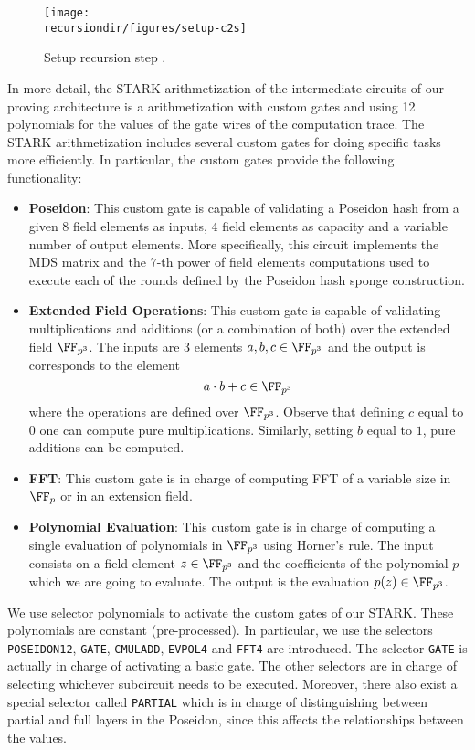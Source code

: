 \begin{figure}[H]
\centering
\texttt{[image: \\recursiondir/figures/setup-c2s]}
\caption{Setup recursion step \ctos.}
\label{fig:setup-c2s}
\end{figure}

In more detail, the STARK arithmetization of the intermediate circuits of our proving architecture is a  arithmetization with custom gates and using 12 polynomials for the values of the gate wires of the computation trace.
The STARK arithmetization includes several custom gates for doing specific tasks more efficiently. In particular, the custom gates provide the following functionality:

\begin{itemize}
\item \textbf{Poseidon}: This custom gate is capable of validating a Poseidon hash from a given $8$ field elements as inputs, $4$ field elements as capacity and a variable number of output elements. More specifically, this circuit implements the MDS matrix and the $7$-th power of field elements computations used to execute each of the rounds defined by the Poseidon hash sponge construction. 
\item \textbf{Extended Field Operations}: This custom gate is capable of validating multiplications and additions (or a combination of both) over the extended field $\FF_{p^3}$. The inputs are $3$ elements $a, b, c \in \FF_{p^3}$ and the output is corresponds to the element 
\[
a \cdot b + c \in \FF_{p^3}
\]
where the operations are defined over $\FF_{p^3}$. Observe that defining $c$ equal to $0$ one can compute pure multiplications. Similarly, setting $b$ equal to $1$, pure additions can be computed. 

\item \textbf{FFT}: This custom gate is in charge of computing FFT of a variable size in $\FF_p$ or in an extension field. 

\item \textbf{Polynomial Evaluation}: This custom gate is in charge of computing a single evaluation of polynomials in $\FF_{p^3}$ using Horner's rule. The input consists on a field element $z \in \FF_{p^3}$ and the coefficients of the polynomial $p$ which we are going to evaluate. The output is the evaluation $p(z) \in \FF_{p^3}$. 
\end{itemize}

We use selector polynomials to activate the custom gates of our STARK. 
These polynomials are constant (pre-processed). In particular, we use the selectors \texttt{POSEIDON12}, \texttt{GATE}, \texttt{CMULADD}, \texttt{EVPOL4} and \texttt{FFT4} are introduced. The selector \texttt{GATE} is actually in charge of activating a basic \plonk gate. The other selectors are in charge of selecting whichever subcircuit needs to be executed. Moreover, there also exist a special selector called \texttt{PARTIAL} which is in charge of distinguishing between partial and full layers in the Poseidon, since this affects the relationships between the values.

